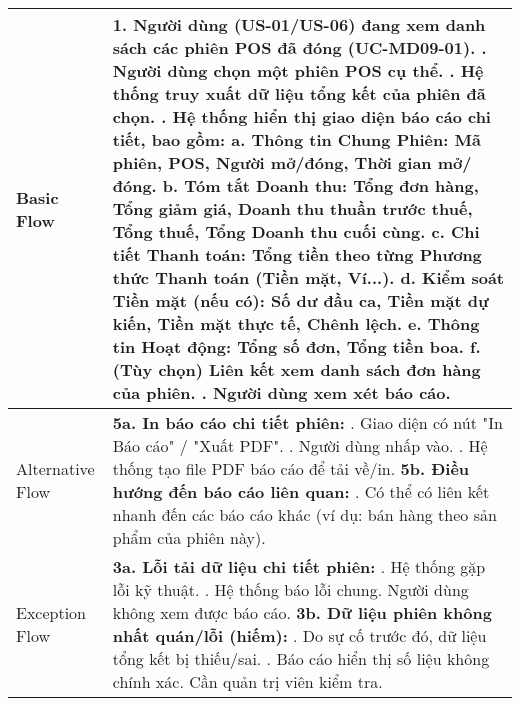\begin{longtable}{|m{4cm}|p{11cm}|}
Basic Flow & 1. Người dùng (US-01/US-06) đang xem danh sách các phiên POS đã đóng (UC-MD09-01). \newline 2. Người dùng chọn một phiên POS cụ thể. \newline 3. Hệ thống truy xuất dữ liệu tổng kết của phiên đã chọn. \newline 4. Hệ thống hiển thị giao diện báo cáo chi tiết, bao gồm: \newline    a. \textbf{Thông tin Chung Phiên:} Mã phiên, POS, Người mở/đóng, Thời gian mở/đóng. \newline    b. \textbf{Tóm tắt Doanh thu:} Tổng đơn hàng, Tổng giảm giá, Doanh thu thuần trước thuế, Tổng thuế, Tổng Doanh thu cuối cùng. \newline    c. \textbf{Chi tiết Thanh toán:} Tổng tiền theo từng Phương thức Thanh toán (Tiền mặt, Ví...). \newline    d. \textbf{Kiểm soát Tiền mặt (nếu có):} Số dư đầu ca, Tiền mặt dự kiến, Tiền mặt thực tế, Chênh lệch. \newline    e. \textbf{Thông tin Hoạt động:} Tổng số đơn, Tổng tiền boa. \newline    f. (Tùy chọn) Liên kết xem danh sách đơn hàng của phiên. \newline 5. Người dùng xem xét báo cáo. \\
\hline
Alternative Flow & \textbf{5a. In báo cáo chi tiết phiên:} \newline    1. Giao diện có nút "In Báo cáo" / "Xuất PDF". \newline    2. Người dùng nhấp vào. \newline    3. Hệ thống tạo file PDF báo cáo để tải về/in. \newline \textbf{5b. Điều hướng đến báo cáo liên quan:} \newline    1. Có thể có liên kết nhanh đến các báo cáo khác (ví dụ: bán hàng theo sản phẩm của phiên này). \\
\hline
Exception Flow & \textbf{3a. Lỗi tải dữ liệu chi tiết phiên:} \newline    1. Hệ thống gặp lỗi kỹ thuật. \newline    2. Hệ thống báo lỗi chung. Người dùng không xem được báo cáo. \newline \textbf{3b. Dữ liệu phiên không nhất quán/lỗi (hiếm):} \newline    1. Do sự cố trước đó, dữ liệu tổng kết bị thiếu/sai. \newline    2. Báo cáo hiển thị số liệu không chính xác. Cần quản trị viên kiểm tra. \\

\end{longtable}
